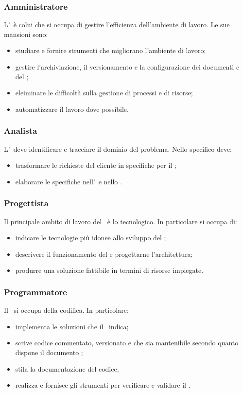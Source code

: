 \documentclass[../NormeDiProgetto.tex]{subfiles}
\begin{document}
			\subsubsection{Amministratore}
				L'\amministratore\ è colui che si occupa di gestire l'efficienza dell'ambiente di lavoro. 
				Le sue mansioni sono:
				\begin{itemize}
					\item studiare e fornire strumenti che migliorano l'ambiente di lavoro;
					\item gestire l'archiviazione, il versionamento e la configurazione dei documenti e del ;
					\item eleiminare le difficoltà sulla gestione di processi e di risorse;
					\item automatizzare il lavoro dove possibile.
				\end{itemize}
			\subsubsection{Analista}
				L'\analista\ deve identificare e tracciare il dominio del problema. 
				Nello specifico deve:
				\begin{itemize}
					\item trasformare le richieste del cliente in specifiche per il ;
					\item elaborare le specifiche nell'\analisideirequisiti\ e nello \studiodifattibilita.
				\end{itemize} 
			\subsubsection{Progettista}
				Il principale ambito di lavoro del \progettista\ è lo  tecnologico.
				In particolare si occupa di:
				\begin{itemize}
					\item indicare le tecnologie più idonee allo sviluppo del ;
					\item descrivere il funzionamento del  e progettarne l'architettura;
					\item produrre una soluzione fattibile in termini di risorse impiegate.
				\end{itemize}	
			\subsubsection{Programmatore}
				Il \programmatore\ si occupa della codifica.
				In particolare:
				\begin{itemize}
					\item implementa le soluzioni che il \progettista\ indica;
					\item scrive codice commentato, versionato e che sia mantenibile secondo quanto dispone il documento \normediprogetto;
					\item stila la documentazione del codice;
					\item realizza e fornisce gli strumenti per verificare e validare il .
				\end{itemize}
\end{document}
